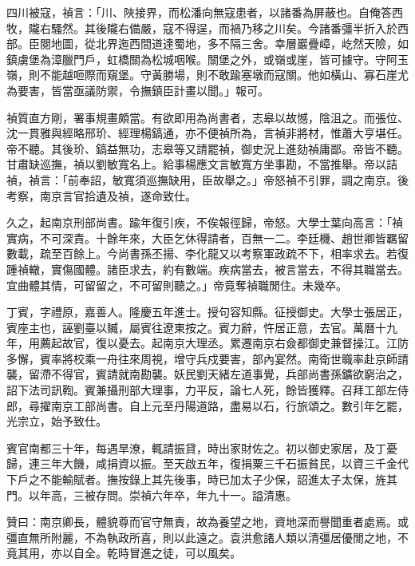 \begin{pinyinscope}
四川被寇，禎言：「川、陜接界，而松潘向無寇患者，以諸番為屏蔽也。自俺答西牧，隴右騷然。其後隴右備嚴，寇不得逞，而禍乃移之川矣。今諸番彊半折入於西部。臣閱地圖，從北界迤西間道達蜀地，多不隔三舍。幸層巖疊嶂，屹然天險，如鎮虜堡為漳臘門戶，虹橋關為松城咽喉。關堡之外，或嶺或崖，皆可據守。守阿玉嶺，則不能越咂際而窺堡。守黃勝場，則不敢踰塞墩而寇關。他如橫山、寡石崖尤為要害，皆當亟議防禦，令撫鎮臣計畫以聞。」報可。

禎質直方剛，署事規畫頗當。有欲即用為尚書者，志皋以故憾，陰沮之。而張位、沈一貫雅與經略邢玠、經理楊鎬通，亦不便禎所為，言禎非將材，惟蕭大亨堪任。帝不聽。其後玠、鎬益無功，志皋等又請罷禎，御史況上進劾禎庸鄙。帝皆不聽。甘肅缺巡撫，禎以劉敏寬名上。給事楊應文言敏寬方坐事勘，不當推舉。帝以詰禎，禎言：「前奉詔，敏寬須巡撫缺用，臣故舉之。」帝怒禎不引罪，調之南京。後考察，南京言官拾遺及禎，遂命致仕。

久之，起南京刑部尚書。踰年復引疾，不俟報徑歸，帝怒。大學士葉向高言：「禎實病，不可深責。十餘年來，大臣乞休得請者，百無一二。李廷機、趙世卿皆羈留數載，疏至百餘上。今尚書孫丕揚、李化龍又以考察軍政疏不下，相率求去。若復踵禎轍，實傷國體。諸臣求去，約有數端。疾病當去，被言當去，不得其職當去。宜曲體其情，可留留之，不可留則聽之。」帝竟奪禎職閒住。未幾卒。

丁賓，字禮原，嘉善人。隆慶五年進士。授句容知縣。征授御史。大學士張居正，賓座主也，誣劉臺以贓，屬賓往遼東按之。賓力辭，忤居正意，去官。萬曆十九年，用薦起故官，復以憂去。起南京大理丞。累遷南京右僉都御史兼督操江。江防多懈，賓率將校乘一舟往來周視，增守兵戍要害，部內宴然。南衛世職率赴京師請襲，留滯不得官，賓請就南勘襲。妖民劉天緒左道事覺，兵部尚書孫鑛欲窮治之，詔下法司訊鞫。賓兼攝刑部大理事，力平反，論七人死，餘皆獲釋。召拜工部左侍郎，尋擢南京工部尚書。自上元至丹陽道路，盡易以石，行旅頌之。數引年乞罷，光宗立，始予致仕。

賓官南都三十年，每遇旱潦，輒請振貸，時出家財佐之。初以御史家居，及丁憂歸，連三年大饑，咸捐資以振。至天啟五年，復捐粟三千石振貧民，以資三千金代下戶之不能輸賦者。撫按錄上其先後事，時已加太子少保，詔進太子太保，旌其門。以年高，三被存問。崇禎六年卒，年九十一。謚清惠。

贊曰：南京卿長，體貌尊而官守無責，故為養望之地，資地深而譽聞重者處焉。或彊直無所附麗，不為執政所喜，則以此遠之。袁洪愈諸人類以清彊居優閒之地，不竟其用，亦以自全。乾時冒進之徒，可以風矣。


\end{pinyinscope}